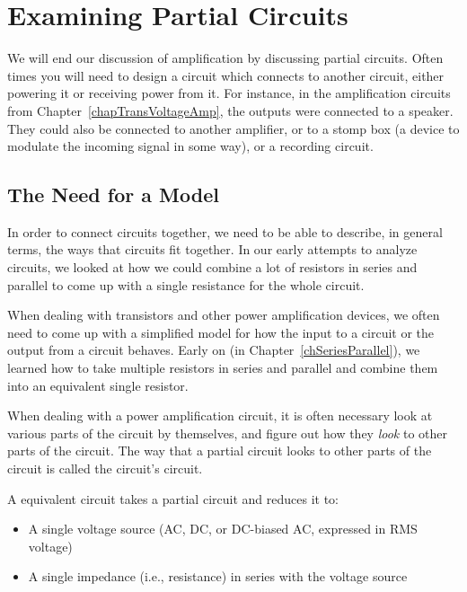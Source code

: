 \chapter{Examining Partial Circuits}


We will end our discussion of amplification by discussing partial circuits.
Often times you will need to design a circuit which connects to another circuit, either powering it or receiving power from it.
For instance, in the amplification circuits from Chapter~\ref{chapTransVoltageAmp}, the outputs were connected to a speaker.
They could also be connected to another amplifier, or to a stomp box (a device to modulate the incoming signal in some way), or a recording circuit.

\section{The Need for a Model}

In order to connect circuits together, we need to be able to describe, in general terms, the ways that circuits fit together.
In our early attempts to analyze circuits, we looked at how we could combine a lot of resistors in series and parallel to come up with a single resistance for the whole circuit.

When dealing with transistors and other power amplification devices, we often need to come up with a simplified model for how the input to a circuit or the output from a circuit behaves.
Early on (in Chapter~\ref{chSeriesParallel}), we learned how to take multiple resistors in series and parallel and combine them into an equivalent single resistor.

When dealing with a power amplification circuit, it is often necessary look at various parts of the circuit by themselves, and figure out how they \emph{look} to other parts of the circuit.
The way that a partial circuit looks to other parts of the circuit is called the circuit's  circuit.


A \thev equivalent circuit takes a partial circuit and reduces it to:

\begin{itemize}
\item A single voltage source (AC, DC, or DC-biased AC, expressed in RMS voltage)
\item A single impedance (i.e., resistance) in series with the voltage source
\end{itemize}

